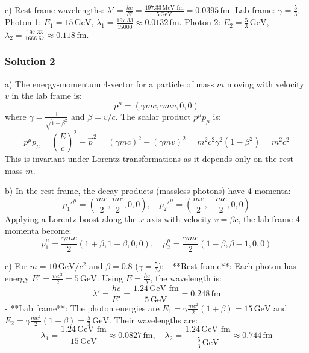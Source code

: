 \documentclass{article}
\begin{document}
c) Rest frame wavelengths: \( \lambda' = \frac{hc}{E'} = \frac{197.33 \, \text{MeV fm}}{5 \, \text{GeV}} = 0.0395 \, \text{fm} \). Lab frame: \( \gamma = \frac{5}{3} \). Photon 1: \( E_1 = 15 \, \text{GeV} \), \( \lambda_1 = \frac{197.33}{15000} \approx 0.0132 \, \text{fm} \). Photon 2: \( E_2 = \frac{5}{3} \, \text{GeV} \), \( \lambda_2 = \frac{197.33}{1666.67} \approx 0.118 \, \text{fm} \).


\subsubsection{Solution 2}
a) The energy-momentum 4-vector for a particle of mass \(m\) moving with velocity \(v\) in the lab frame is:
\[
p^\mu = \left( \gamma m c, \gamma m v, 0, 0 \right)
\]
where \(\gamma = \frac{1}{\sqrt{1 - \beta^2}}\) and \(\beta = v/c\). The scalar product \(p^\mu p_\mu\) is:
\[
p^\mu p_\mu = \left( \frac{E}{c} \right)^2 - \vec{p}^2 = (\gamma m c)^2 - (\gamma m v)^2 = m^2 c^2 \gamma^2 \left(1 - \beta^2\right) = m^2 c^2
\]
This is invariant under Lorentz transformations as it depends only on the rest mass \(m\).

b) In the rest frame, the decay products (massless photons) have 4-momenta:
\[
p_1'^\mu = \left( \frac{m c}{2}, \frac{m c}{2}, 0, 0 \right), \quad p_2'^\mu = \left( \frac{m c}{2}, -\frac{m c}{2}, 0, 0 \right)
\]
Applying a Lorentz boost along the \(x\)-axis with velocity \(v = \beta c\), the lab frame 4-momenta become:
\[
p_1^\mu = \frac{\gamma m c}{2} \left(1 + \beta, 1 + \beta, 0, 0 \right), \quad p_2^\mu = \frac{\gamma m c}{2} \left(1 - \beta, \beta - 1, 0, 0 \right)
\]

c) For \(m = 10 \, \text{GeV}/c^2\) and \(\beta = 0.8\) (\(\gamma = \frac{5}{3}\)):
- **Rest frame**: Each photon has energy \(E' = \frac{m c^2}{2} = 5 \, \text{GeV}\). Using \(E = \frac{hc}{\lambda}\), the wavelength is:
\[
\lambda' = \frac{hc}{E'} = \frac{1.24 \, \text{GeV fm}}{5 \, \text{GeV}} = 0.248 \, \text{fm}
\]
- **Lab frame**: The photon energies are \(E_1 = \gamma \frac{m c^2}{2} (1 + \beta) = 15 \, \text{GeV}\) and \(E_2 = \gamma \frac{m c^2}{2} (1 - \beta) = \frac{5}{3} \, \text{GeV}\). Their wavelengths are:
\[
\lambda_1 = \frac{1.24 \, \text{GeV fm}}{15 \, \text{GeV}} \approx 0.0827 \, \text{fm}, \quad \lambda_2 = \frac{1.24 \, \text{GeV fm}}{\frac{5}{3} \, \text{GeV}} \approx 0.744 \, \text{fm}
\]
\end{document}
